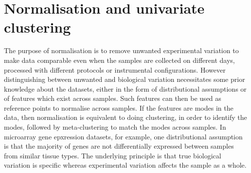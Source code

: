 \chapter{ \label{appendix:normalisation} Normalisation and univariate clustering}


The purpose of normalisation is to remove unwanted experimental variation to make data comparable even when the samples are
collected on different days, processed with different protocols or instrumental configurations.
However distinguishing between unwanted and biological variation necessitates some prior knowledge about the datasets, either in the form of distributional assumptions
or of features which exist across samples.
Such features can then be used as reference points to normalise across samples.
If the features are modes in the data, then normalisation is equivalent to doing clustering, in order to identify the modes,
followed by meta-clustering to match the modes across samples.
In microarray gene epxression datasets, for example, one distributional assumption is that the majority of genes are not differentially expressed between samples from
similar tissue types.
The underlying principle is that true biological variation is specific whereas experimental variation affects the sample as a whole.





